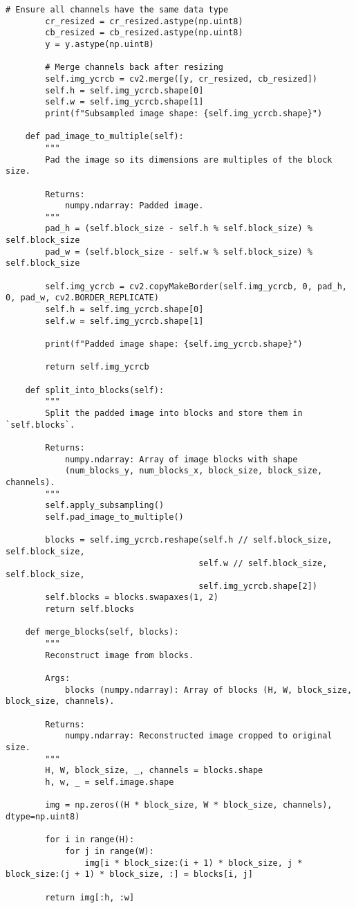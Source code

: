 \begin{lstlisting}[caption={Класс подготовки изображения}]
        # Ensure all channels have the same data type
        cr_resized = cr_resized.astype(np.uint8)
        cb_resized = cb_resized.astype(np.uint8)
        y = y.astype(np.uint8)

        # Merge channels back after resizing
        self.img_ycrcb = cv2.merge([y, cr_resized, cb_resized])
        self.h = self.img_ycrcb.shape[0]
        self.w = self.img_ycrcb.shape[1]
        print(f"Subsampled image shape: {self.img_ycrcb.shape}")

    def pad_image_to_multiple(self):
        """
        Pad the image so its dimensions are multiples of the block size.

        Returns:
            numpy.ndarray: Padded image.
        """
        pad_h = (self.block_size - self.h % self.block_size) % self.block_size
        pad_w = (self.block_size - self.w % self.block_size) % self.block_size

        self.img_ycrcb = cv2.copyMakeBorder(self.img_ycrcb, 0, pad_h, 0, pad_w, cv2.BORDER_REPLICATE)
        self.h = self.img_ycrcb.shape[0]
        self.w = self.img_ycrcb.shape[1]

        print(f"Padded image shape: {self.img_ycrcb.shape}")

        return self.img_ycrcb

    def split_into_blocks(self):
        """
        Split the padded image into blocks and store them in `self.blocks`.

        Returns:
            numpy.ndarray: Array of image blocks with shape 
            (num_blocks_y, num_blocks_x, block_size, block_size, channels).
        """
        self.apply_subsampling()
        self.pad_image_to_multiple()

        blocks = self.img_ycrcb.reshape(self.h // self.block_size, self.block_size,
                                       self.w // self.block_size, self.block_size,
                                       self.img_ycrcb.shape[2])
        self.blocks = blocks.swapaxes(1, 2)
        return self.blocks

    def merge_blocks(self, blocks):
        """
        Reconstruct image from blocks.

        Args:
            blocks (numpy.ndarray): Array of blocks (H, W, block_size, block_size, channels).

        Returns:
            numpy.ndarray: Reconstructed image cropped to original size.
        """
        H, W, block_size, _, channels = blocks.shape
        h, w, _ = self.image.shape

        img = np.zeros((H * block_size, W * block_size, channels), dtype=np.uint8)

        for i in range(H):
            for j in range(W):
                img[i * block_size:(i + 1) * block_size, j * block_size:(j + 1) * block_size, :] = blocks[i, j]

        return img[:h, :w]

\end{lstlisting}





